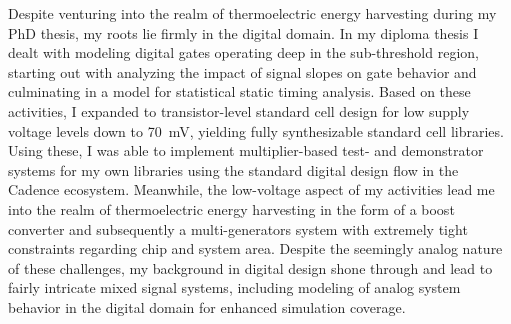 Despite venturing into the realm of thermoelectric energy harvesting during my PhD thesis, my roots lie firmly in the digital domain. 
In my diploma thesis I dealt with modeling digital gates operating deep in the sub-threshold region, starting out with analyzing the impact of signal slopes on gate behavior and culminating in a model for statistical static timing analysis. Based on these activities, I expanded to transistor-level standard cell design for low supply voltage levels down to \SI{70}{\milli\volt}, yielding fully synthesizable standard cell libraries. Using  these, I was able to implement multiplier-based test- and demonstrator systems for my own libraries using the standard digital design flow in the Cadence ecosystem.%
 Meanwhile, the low-voltage aspect of my activities lead me into the realm of thermoelectric energy harvesting in the form of a boost converter and subsequently a multi-generators system with extremely tight constraints regarding chip and system area. Despite the seemingly analog nature of these challenges, my background in digital design shone through and lead to fairly intricate mixed signal systems, including modeling of analog system behavior in the digital domain for enhanced simulation coverage.\par

